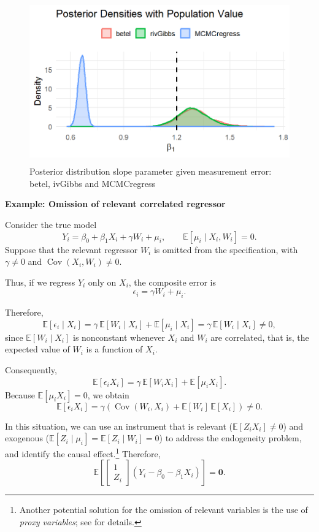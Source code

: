 \begin{figure}[h!]
	\includegraphics[width=340pt, height=200pt]{Chapters/chapter12/figures/FigME.png}
	\caption[List of figure caption goes here]{Posterior distribution slope parameter given measurement error: betel, ivGibbs and MCMCregress}\label{fig12_Measurement}
\end{figure} 
 
\textbf{Example: Omission of relevant correlated regressor}

Consider the true model
\[
Y_i = \beta_0 + \beta_1 X_i + \gamma W_i + \mu_i,
\qquad \mathbb{E}[\mu_i \mid X_i, W_i] = 0.
\]
Suppose that the relevant regressor $W_i$ is omitted from the specification, with $\gamma \neq 0$ and \(\operatorname{Cov}(X_i, W_i) \neq 0\).

Thus, if we regress $Y_i$ only on $X_i$, the composite error is
\[
\epsilon_i = \gamma W_i + \mu_i.
\]

Therefore,
\[
\mathbb{E}[\epsilon_i \mid X_i] 
= \gamma \, \mathbb{E}[W_i \mid X_i] + \mathbb{E}[\mu_i \mid X_i]
= \gamma \, \mathbb{E}[W_i \mid X_i] \neq 0,
\]
since $\mathbb{E}[W_i \mid X_i]$ is nonconstant whenever $X_i$ and $W_i$ are correlated, that is, the expected value of $W_i$ is a function of $X_i$.

Consequently,
\[
\mathbb{E}[\epsilon_i X_i] 
= \gamma \, \mathbb{E}[W_i X_i] + \mathbb{E}[\mu_i X_i].
\]
Because $\mathbb{E}[\mu_i X_i]=0$, we obtain
\[
\mathbb{E}[\epsilon_i X_i] = \gamma (\operatorname{Cov}(W_i,X_i) 
+ \mathbb{E}[W_i] \, \mathbb{E}[X_i])\neq 0.
\]

In this situation, we can use an instrument that is relevant ($\mathbb{E}[Z_i X_i] \neq 0$) and exogenous ($\mathbb{E}[Z_i \mid \mu_i] = \mathbb{E}[Z_i \mid W_i] = 0$) to address the endogeneity problem, and identify the causal effect.\footnote{Another potential solution for the omission of relevant variables is the use of \textit{proxy variables}; see \cite{wooldridge2010econometric} for details.} Therefore,
\[
\mathbb{E}\left[\begin{bmatrix}
	1\\
	Z_i
\end{bmatrix}(Y_i-\beta_0-\beta_1X_i)\right]=\mathbf{0}.
\] 

